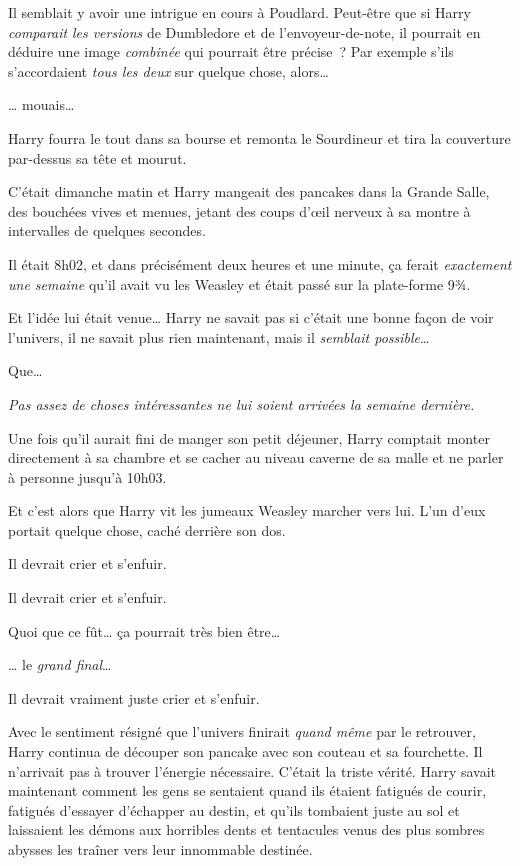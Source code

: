 Il semblait y avoir une intrigue en cours à Poudlard. Peut-être que si Harry \emph{comparait} \emph{les versions} de Dumbledore et de l'envoyeur-de-note, il pourrait en déduire une image \emph{combinée} qui pourrait être précise~? Par exemple s'ils s'accordaient \emph{tous les deux} sur quelque chose, alors…

… mouais…

Harry fourra le tout dans sa bourse et remonta le Sourdineur et tira la couverture par-dessus sa tête et mourut.

\later

C'était dimanche matin et Harry mangeait des pancakes dans la Grande Salle, des bouchées vives et menues, jetant des coups d'œil nerveux à sa montre à intervalles de quelques secondes.

Il était 8h02, et dans précisément deux heures et une minute, ça ferait \emph{exactement une semaine} qu'il avait vu les Weasley et était passé sur la plate-forme 9¾.

Et l'idée lui était venue… Harry ne savait pas si c'était une bonne façon de voir l'univers, il ne savait plus rien maintenant, mais il \emph{semblait possible}…

Que…

\emph{Pas assez de choses intéressantes ne lui soient arrivées la semaine dernière.}

Une fois qu'il aurait fini de manger son petit déjeuner, Harry comptait monter directement à sa chambre et se cacher au niveau caverne de sa malle et ne parler à personne jusqu'à 10h03.

Et c'est alors que Harry vit les jumeaux Weasley marcher vers lui. L'un d'eux portait quelque chose, caché derrière son dos.

Il devrait crier et s'enfuir.

Il devrait crier et s'enfuir.

Quoi que ce fût… ça pourrait très bien être…

… le \emph{grand final}…

Il devrait vraiment juste crier et s'enfuir.

Avec le sentiment résigné que l'univers finirait \emph{quand même} par le retrouver, Harry continua de découper son pancake avec son couteau et sa fourchette. Il n'arrivait pas à trouver l'énergie nécessaire. C'était la triste vérité. Harry savait maintenant comment les gens se sentaient quand ils étaient fatigués de courir, fatigués d'essayer d'échapper au destin, et qu'ils tombaient juste au sol et laissaient les démons aux horribles dents et tentacules venus des plus sombres abysses les traîner vers leur innommable destinée.

